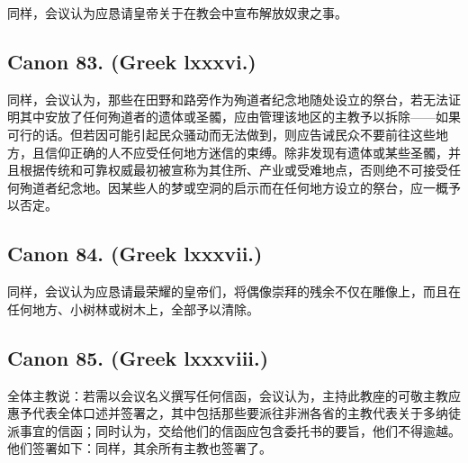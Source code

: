 \par

同样，会议认为应恳请皇帝关于在教会中宣布解放奴隶之事。\par


\subsection{Canon 83. (Greek lxxxvi.)}

\par

同样，会议认为，那些在田野和路旁作为殉道者纪念地随处设立的祭台，若无法证明其中安放了任何殉道者的遗体或圣髑，应由管理该地区的主教予以拆除——如果可行的话。但若因可能引起民众骚动而无法做到，则应告诫民众不要前往这些地方，且信仰正确的人不应受任何地方迷信的束缚。除非发现有遗体或某些圣髑，并且根据传统和可靠权威最初被宣称为其住所、产业或受难地点，否则绝不可接受任何殉道者纪念地。因某些人的梦或空洞的启示而在任何地方设立的祭台，应一概予以否定。\par


\subsection{Canon 84. (Greek lxxxvii.)}

\par

同样，会议认为应恳请最荣耀的皇帝们，将偶像崇拜的残余不仅在雕像上，而且在任何地方、小树林或树木上，全部予以清除。\par


\subsection{Canon 85. (Greek lxxxviii.)}

\par

全体主教说：若需以会议名义撰写任何信函，会议认为，主持此教座的可敬主教应惠予代表全体口述并签署之，其中包括那些要派往非洲各省的主教代表关于多纳徒派事宜的信函；同时认为，交给他们的信函应包含委托书的要旨，他们不得逾越。他们签署如下：同样，其余所有主教也签署了。\par


